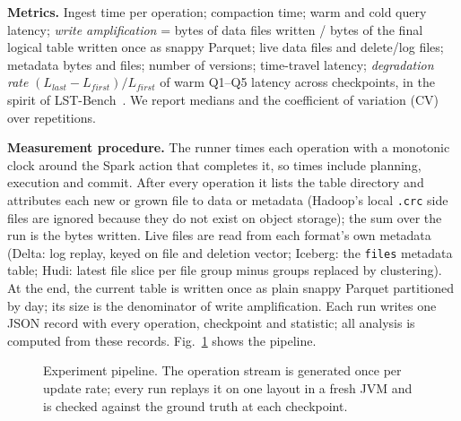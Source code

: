 \documentclass[conference]{IEEEtran}
\newcommand{\sys}{\textsc{sensor-LST}}
\begin{document}
\textbf{Metrics.} Ingest time per operation; compaction time; warm and cold query latency; \emph{write amplification}
= bytes of data files written / bytes of the final logical table written once as snappy Parquet; live data files and
delete/log files; metadata bytes and files; number of versions; time-travel latency; \emph{degradation rate}
$(L_{last}-L_{first})/L_{first}$ of warm Q1--Q5 latency across checkpoints, in the spirit of
LST-Bench~\cite{camacho2024lstbench}. We report medians and the coefficient of variation (CV) over repetitions.

\textbf{Measurement procedure.} The runner times each operation with a monotonic clock around the Spark action that
completes it, so times include planning, execution and commit. After every operation it lists the table directory and
attributes each new or grown file to data or metadata (Hadoop's local \texttt{.crc} side files are ignored because they
do not exist on object storage); the sum over the run is the bytes written. Live files are read from each format's own
metadata (Delta: log replay, keyed on file and deletion vector; Iceberg: the \texttt{files} metadata table; Hudi: latest
file slice per file group minus groups replaced by clustering). At the end, the current table is written once as
plain snappy Parquet partitioned by day; its size is the denominator of write amplification. Each run writes one JSON
record with every operation, checkpoint and statistic; all analysis is computed from these records.
Fig.~\ref{fig:pipeline} shows the pipeline.

\begin{figure}[t]\centering
{}
\caption{Experiment pipeline. The operation stream is generated once per update rate; every run replays it on one
layout in a fresh JVM and is checked against the ground truth at each checkpoint.}
\label{fig:pipeline}
\end{figure}
\end{document}
